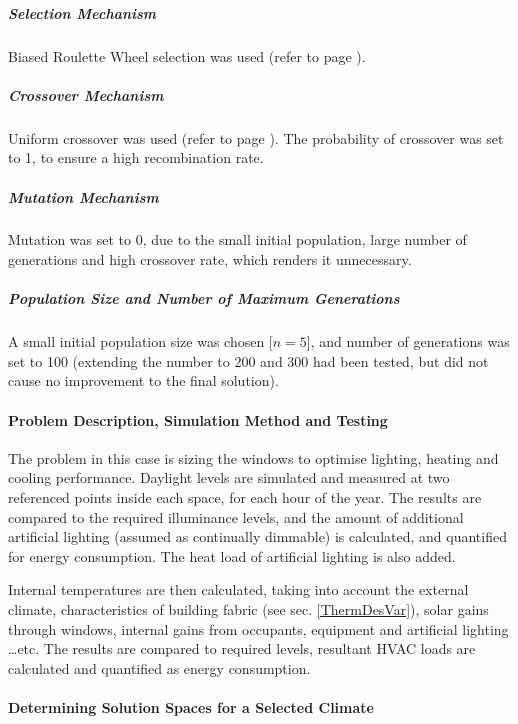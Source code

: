 \subparagraph{Selection Mechanism}\mbox{}

Biased Roulette Wheel selection was used (refer to page \pageref{eqn:BiasedRoulette}).

\subparagraph{Crossover Mechanism}\mbox{}

Uniform crossover was used (refer to page \pageref{eqn:UniformCross}). The probability of crossover was set to 1, to ensure a high recombination rate.

\subparagraph{Mutation Mechanism}\mbox{}

Mutation was set to 0, due to the small initial population, large number of generations and high crossover rate, which renders it unnecessary.

\subparagraph{Population Size and Number of Maximum Generations}\mbox{}

A small initial population size was chosen [$n=5$], and number of generations was set to 100 (extending the number to 200 and 300 had been tested, but did not cause no improvement to the final solution).

\paragraph{Problem Description, Simulation Method and Testing}\mbox{}

The problem in this case is sizing the windows to optimise lighting, heating and cooling performance. Daylight levels are simulated and measured at two referenced points inside each space, for each hour of the year. The results are compared to the required illuminance levels, and the amount of additional artificial lighting (assumed as continually dimmable) is calculated, and quantified for energy consumption. The heat load of artificial lighting is also added.

Internal temperatures are then calculated, taking into account the external climate, characteristics of building fabric (see sec. \ref{ThermDesVar}), solar gains through windows, internal gains from occupants, equipment and artificial lighting \ldots\hspace{0cm}etc. The results are compared to required levels, resultant HVAC loads are calculated and quantified as energy consumption. 

\paragraph{Determining Solution Spaces for a Selected Climate}\mbox{}

